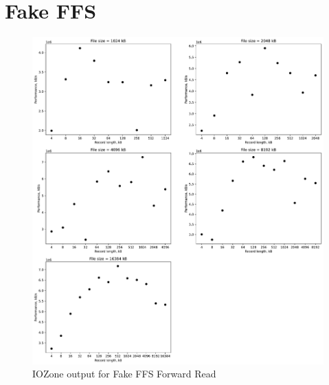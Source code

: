 \section{Fake FFS}
\begin{figure}[!htb]
	\label{fig:app_bench_fffs_rnd_read}
	\begin{center}
		\includegraphics[width=1.0\textwidth]{figures/benchmarking/fake-ffs/Reader.pdf}
	\end{center}
	\caption{IOZone output for Fake FFS Forward Read}
\end{figure}

